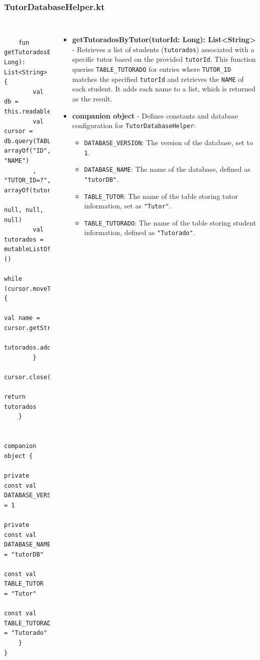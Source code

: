 \documentclass[pdf,
serif,
compress,
xcolor=table,
dvipsnames,
spanish,
aspectratio=169]{beamer}
\begin{document}
\begin{frame}[fragile]
    \frametitle{TutorDatabaseHelper.kt}
\begin{columns}
\begin{verbatim}

    fun getTutoradosByTutor(tutorId: Long): List<String> {
        val db = this.readableDatabase
        val cursor = db.query(TABLE_TUTORADO, arrayOf("ID", "NAME")
        , "TUTOR_ID=?", arrayOf(tutorId.toString()), 
        null, null, null)
        val tutorados = mutableListOf<String>()
        while (cursor.moveToNext()) {
            val name = cursor.getString(cursor.getColumnIndexOrThrow("NAME"))
            tutorados.add(name)
        }
        cursor.close()
        return tutorados
    }

    companion object {
        private const val DATABASE_VERSION = 1
        private const val DATABASE_NAME = "tutorDB"
        const val TABLE_TUTOR = "Tutor"
        const val TABLE_TUTORADO = "Tutorado"
    }
}

\end{verbatim}
\begin{itemize}\tiny
    \item \textbf{getTutoradosByTutor(tutorId: Long): List<String>} - Retrieves a list of students (\texttt{tutorados}) associated with a specific tutor based on the provided \texttt{tutorId}. This function queries \texttt{TABLE\_TUTORADO} for entries where \texttt{TUTOR\_ID} matches the specified \texttt{tutorId} and retrieves the \texttt{NAME} of each student. It adds each name to a list, which is returned as the result.

    \item \textbf{companion object} - Defines constants and database configuration for \texttt{TutorDatabaseHelper}:
    \begin{itemize}\tiny
        \item \texttt{DATABASE\_VERSION}: The version of the database, set to \texttt{1}.
        \item \texttt{DATABASE\_NAME}: The name of the database, defined as \texttt{"tutorDB"}.
        \item \texttt{TABLE\_TUTOR}: The name of the table storing tutor information, set as \texttt{"Tutor"}.
        \item \texttt{TABLE\_TUTORADO}: The name of the table storing student information, defined as \texttt{"Tutorado"}.
    \end{itemize}
\end{itemize}

\end{columns}
\end{frame}
\end{document}
